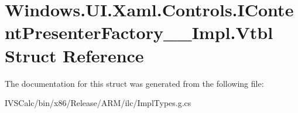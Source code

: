\hypertarget{struct_windows_1_1_u_i_1_1_xaml_1_1_controls_1_1_i_content_presenter_factory_____impl_1_1_vtbl}{}\section{Windows.\+U\+I.\+Xaml.\+Controls.\+I\+Content\+Presenter\+Factory\+\_\+\+\_\+\+Impl.\+Vtbl Struct Reference}
\label{struct_windows_1_1_u_i_1_1_xaml_1_1_controls_1_1_i_content_presenter_factory_____impl_1_1_vtbl}


The documentation for this struct was generated from the following file\+:\begin{DoxyCompactItemize}
\item 
I\+V\+S\+Calc/bin/x86/\+Release/\+A\+R\+M/ilc/Impl\+Types.\+g.\+cs\end{DoxyCompactItemize}
